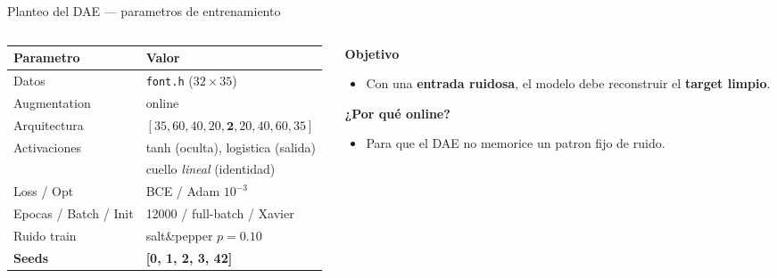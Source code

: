 \documentclass[aspectratio=169, 10pt]{beamer}
\begin{document}
\begin{frame}{Planteo del DAE --- parametros de entrenamiento}
  \begin{columns}[T]
    \begin{column}{0.55\textwidth}
      \begin{table}\small
        \begin{tabular}{ll}
          \toprule
          Parametro & Valor \\
          \midrule
          Datos        & \texttt{font.h} ($32\times35$) \\
          Augmentation & online \\
          Arquitectura & $[35,60,40,20,\mathbf{2},20,40,60,35]$ \\
          Activaciones & tanh (oculta), logistica (salida) \\
                       & cuello \emph{lineal} (identidad) \\
          Loss / Opt   & BCE / Adam $10^{-3}$ \\
          Epocas / Batch / Init & 12000 / full-batch / Xavier \\
          Ruido train  & salt\&pepper $p=0.10$ \\
          \textbf{Seeds} & \textbf{[0, 1, 2, 3, 42]} \\
          \bottomrule
        \end{tabular}
      \end{table}
    \end{column}
    \begin{column}{0.44\textwidth}
      \textbf{Objetivo}
      \begin{itemize}
        \item Con una \textbf{entrada ruidosa}, el modelo debe reconstruir el
              \textbf{target limpio}.
      \end{itemize}
      \vspace{0.3em}
      \textbf{¿Por qué online?}
      \begin{itemize}
        \item Para que el DAE no memorice un patron fijo de ruido.
      \end{itemize}
    \end{column}
  \end{columns}
\end{frame}
\end{document}
